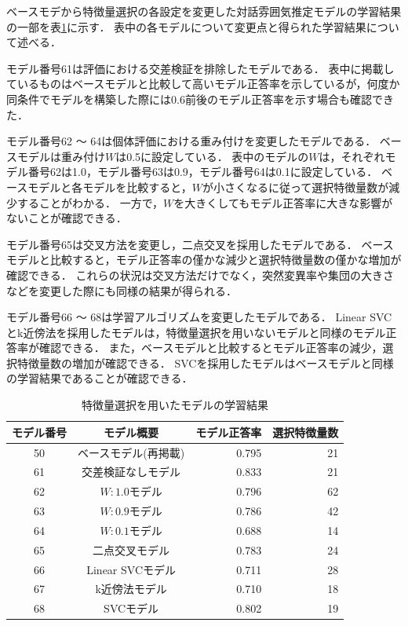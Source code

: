 ベースモデから特徴量選択の各設定を変更した対話雰囲気推定モデルの学習結果の一部を表\ref{tab:learn_result_with_ga_change_params}に示す．
表中の各モデルについて変更点と得られた学習結果について述べる．

モデル番号61は評価における交差検証を排除したモデルである．
表中に掲載しているものはベースモデルと比較して高いモデル正答率を示しているが，何度か同条件でモデルを構築した際には0.6前後のモデル正答率を示す場合も確認できた．

モデル番号62 〜 64は個体評価における重み付けを変更したモデルである．
ベースモデルは重み付け$W$は0.5に設定している．
表中のモデルの$W$は，それぞれモデル番号62は1.0，モデル番号63は0.9，モデル番号64は0.1に設定している．
ベースモデルと各モデルを比較すると，$W$が小さくなるに従って選択特徴量数が減少することがわかる．
一方で，$W$を大きくしてもモデル正答率に大きな影響がないことが確認できる．

モデル番号65は交叉方法を変更し，二点交叉を採用したモデルである．
ベースモデルと比較すると，モデル正答率の僅かな減少と選択特徴量数の僅かな増加が確認できる．
これらの状況は交叉方法だけでなく，突然変異率や集団の大きさなどを変更した際にも同様の結果が得られる．

モデル番号66 〜 68は学習アルゴリズムを変更したモデルである．
Linear SVCとk近傍法を採用したモデルは，特徴量選択を用いないモデルと同様のモデル正答率が確認できる．
また，ベースモデルと比較するとモデル正答率の減少，選択特徴量数の増加が確認できる．
SVCを採用したモデルはベースモデルと同様の学習結果であることが確認できる．

\begin{table}[t]
    \caption{特徴量選択を用いたモデルの学習結果}
    \centering
    \begin{tabular}{|c|c|r|r|}
        \hline
        モデル番号 & モデル概要 & モデル正答率 & 選択特徴量数 \\
        \hline\hline
        50 & ベースモデル(再掲載) & 0.795 & 21 \\ \hline
        61 & 交差検証なしモデル & 0.833 & 21 \\ \hline
        62 & $W:1.0$モデル & 0.796 & 62 \\ \hline
        63 & $W:0.9$モデル & 0.786 & 42 \\ \hline
        64 & $W:0.1$モデル & 0.688 & 14 \\ \hline
        65 & 二点交叉モデル & 0.783 & 24 \\ \hline
        66 & Linear SVCモデル & 0.711 & 28 \\ \hline
        67 & k近傍法モデル & 0.710 & 18 \\ \hline
        68 & SVCモデル & 0.802 & 19 \\ \hline
    \end{tabular}
    \label{tab:learn_result_with_ga_change_params}
\end{table}

